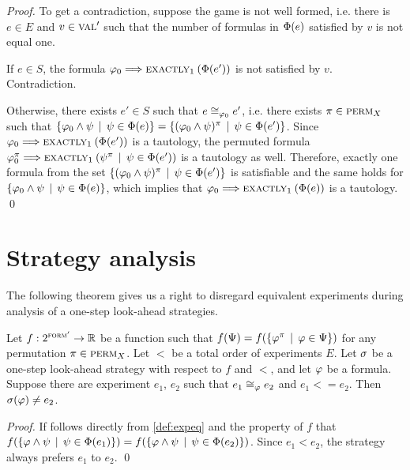 \begin{proof}
To get a contradiction, suppose the game is not well formed, i.e.
  there is $e\in E$ and $v \in \textsc{val}'$ such that the number of
  formulas in $\Phi(e)$ satisfied by $v$ is not equal one.

If $e\in S$, the formula $\varphi_0 ==> \textsc{exactly}_{1}\:(\Phi(e'))$ is not
  satisfied by $v$. Contradiction.

Otherwise, there exists $e'\in S$ such that $e\cong_{\varphi_0}e'$, i.e.
  there exists $\pi\in\textsc{perm}_X$ such that
$\{ \varphi_0\wedge\psi \:\:|\:\: \psi\in\Phi(e) \} =
 \{ (\varphi_0\wedge\psi)^\pi \:\:|\:\: \psi\in\Phi(e') \}$.
Since $\varphi_0 ==> \textsc{exactly}_{1}\:(\Phi(e'))$ is a tautology,
  the permuted formula
  $\varphi_0^\pi ==> \textsc{exactly}_{1}\:(\psi^\pi \:\:|\:\: \psi\in\Phi(e'))$
  is a tautology as well.
Therefore, exactly one formula from the set
 $ \{ (\varphi_0\wedge\psi)^\pi \:\:|\:\: \psi\in\Phi(e') \}$
 is satisfiable and the same holds for
  $\{ \varphi_0\wedge\psi \:\:|\:\: \psi\in\Phi(e) \}$,
 which implies that
 $\varphi_0 ==> \textsc{exactly}_{1}\:(\Phi(e))$
 is a tautology. \qed
\end{proof}


\section{Strategy analysis}

The following theorem gives us a right to disregard equivalent experiments
  during analysis of a one-step look-ahead strategies.

\begin{theorem}
Let $f: 2^{\textsc{form}'} ->\mathbb{R}$ be a function such that
$f(\Psi) = f(\{\varphi^\pi \:\:|\:\: \varphi\in\Psi\})$ for any permutation
$\pi\in\textsc{perm}_X$. Let $<$ be a total order of experiments $E$.
Let $\sigma$ be a one-step look-ahead strategy with respect to $f$ and $<$, and
let $\varphi$ be a formula.
Suppose there are experiment $e_1$, $e_2$ such that $e_1\cong_{\varphi}e_2$ and $e_1<=e_2$.
Then $\sigma(\varphi) \not= e_2$.
\end{theorem}

\begin{proof}
If follows directly from \autoref{def:expeq} and the property of $f$ that
$f(\{\varphi\wedge\psi\:\:|\:\: \psi\in\Phi(e_1)\}) =
 f(\{\varphi\wedge\psi\:\:|\:\: \psi\in\Phi(e_2)\})$.
Since $e_1 < e_2$, the strategy always prefers $e_1$ to $e_2$. \qed
\end{proof}


